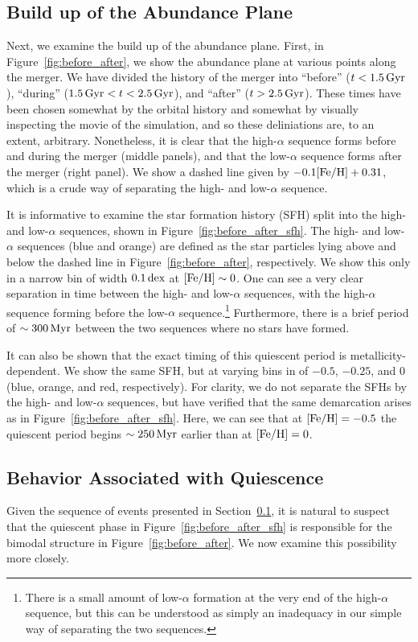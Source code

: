 \subsection{Build up of the Abundance Plane}\label{ssec:abundplane_build}
Next, we examine the build up of the abundance plane. First, in Figure~\ref{fig:before_after}, we show the abundance plane at various points along the merger. We have divided the history of the merger into ``before'' ($t < 1.5\,\textrm{Gyr}$), ``during'' ($1.5\,\textrm{Gyr} < t < 2.5\,\textrm{Gyr}$), and ``after'' ($t > 2.5\,\textrm{Gyr}$). These times have been chosen somewhat by the orbital history and somewhat by visually inspecting the movie of the simulation, and so these deliniations are, to an extent, arbitrary. Nonetheless, it is clear that the high-$\alpha$ sequence forms before and during the merger (middle panels), and that the low-$\alpha$ sequence forms after the merger (right panel). We show a dashed line given by $-0.1[\textrm{Fe}/\textrm{H}] + 0.31$, which is a crude way of separating the high- and low-$\alpha$ sequence.

It is informative to examine the star formation history (SFH) split into the high- and low-$\alpha$ sequences, shown in Figure~\ref{fig:before_after_sfh}. The high- and low-$\alpha$ sequences (blue and orange) are defined as the star particles lying above and below the dashed line in Figure~\ref{fig:before_after}, respectively. We show this only in a narrow bin of width $0.1\,\textrm{dex}$ at $[\textrm{Fe}/\textrm{H}]\sim0$. One can see a very clear separation in time between the high- and low-$\alpha$ sequences, with the high-$\alpha$ sequence forming before the low-$\alpha$ sequence.\footnote{There is a small amount of low-$\alpha$ formation at the very end of the high-$\alpha$ sequence, but this can be understood as simply an inadequacy in our simple way of separating the two sequences.} Furthermore, there is a brief period of $\sim300\,\textrm{Myr}$ between the two sequences where no stars have formed.

It can also be shown that the exact timing of this quiescent period is metallicity-dependent. We show the same SFH, but at varying bins in \FeH{} of $-0.5$, $-0.25$, and $0$ (blue, orange, and red, respectively). For clarity, we do not separate the SFHs by the high- and low-$\alpha$ sequences, but have verified that the same demarcation arises as in Figure~\ref{fig:before_after_sfh}. Here, we can see that at $[\textrm{Fe}/\textrm{H}]=-0.5$ the quiescent period begins $\sim250\,\textrm{Myr}$ earlier than at $[\textrm{Fe}/\textrm{H}]=0$.

\subsection{\alphaFe{} Behavior Associated with Quiescence}
Given the sequence of events presented in Section~\ref{ssec:abundplane_build}, it is natural to suspect that the quiescent phase in Figure~\ref{fig:before_after_sfh} is responsible for the bimodal structure in Figure~\ref{fig:before_after}. We now examine this possibility more closely.

